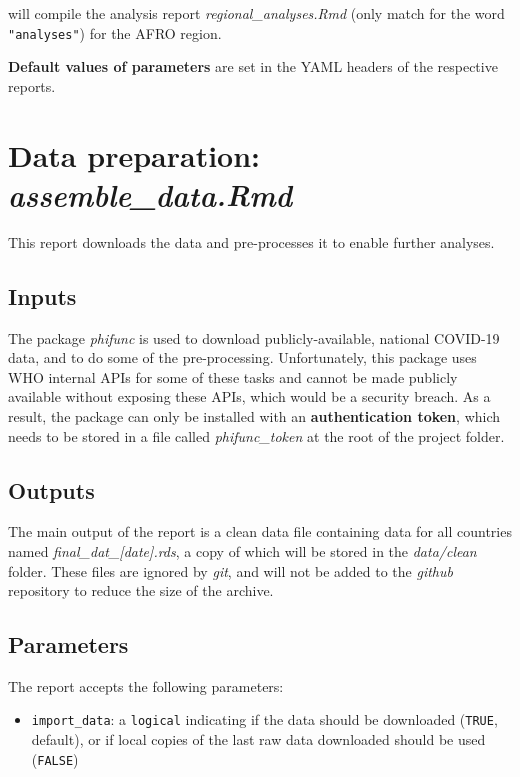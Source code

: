 \documentclass[]{book}
\providecommand{\tightlist}{%
  \setlength{\itemsep}{0pt}\setlength{\parskip}{0pt}}
\begin{document}
will compile the analysis report \emph{regional\_analyses.Rmd} (only match for the
word \texttt{"analyses"}) for the AFRO region.

\textbf{Default values of parameters} are set in the YAML headers of the respective
reports.

\hypertarget{data-preparation-assemble_data.rmd}{%
\section{\texorpdfstring{Data preparation: \emph{assemble\_data.Rmd}}{Data preparation: assemble\_data.Rmd}}\label{data-preparation-assemble_data.rmd}}

This report downloads the data and pre-processes it to enable further analyses.

\hypertarget{inputs}{%
\subsection{Inputs}\label{inputs}}

The package \emph{phifunc} is used to download publicly-available, national COVID-19
data, and to do some of the pre-processing. Unfortunately, this package uses WHO
internal APIs for some of these tasks and cannot be made publicly available
without exposing these APIs, which would be a security breach. As a result, the
package can only be installed with an \textbf{authentication token}, which needs to be
stored in a file called \emph{phifunc\_token} at the root of the project folder.

\hypertarget{outputs}{%
\subsection{Outputs}\label{outputs}}

The main output of the report is a clean data file containing data for all
countries named \emph{final\_dat\_{[}date{]}.rds}, a copy of which will be stored in the
\emph{data/clean} folder. These files are ignored by \emph{git}, and will not be added to
the \emph{github} repository to reduce the size of the archive.

\hypertarget{parameters}{%
\subsection{Parameters}\label{parameters}}

The report accepts the following parameters:

\begin{itemize}
\tightlist
\item
  \texttt{import\_data}: a \texttt{logical} indicating if the data should be downloaded
  (\texttt{TRUE}, default), or if local copies of the last raw data downloaded should
  be used (\texttt{FALSE})
\end{itemize}
\end{document}
